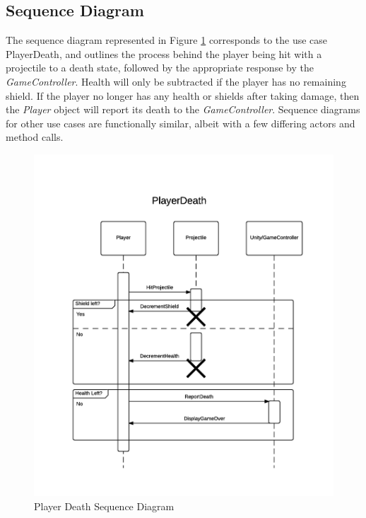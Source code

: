 \documentclass[12pt]{article}       %
\begin{document}
\subsection{Sequence Diagram}
The sequence diagram represented in Figure \ref{PlayerDeath}  corresponds to the use case PlayerDeath, and outlines the process behind the player being hit with a projectile to a death state, followed by the appropriate response by the {\it GameController}. Health will only be subtracted if the player has no remaining shield. If the player no longer has any health or shields after taking damage, then the {\it Player} object will report its death to the {\it GameController}. Sequence diagrams for other use cases are functionally similar, albeit with a few differing actors and method calls.
\begin{figure} [H]
\centering
\includegraphics[width=4.75in]{PlayerDeath.png}
\caption{Player Death Sequence Diagram} \label{PlayerDeath}
\end{figure}
\end{document}
